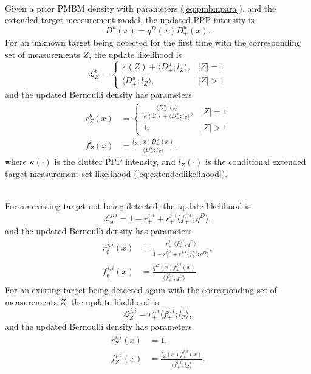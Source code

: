 ~\\
Given a prior PMBM density with parameters (\ref{eq:pmbmpara}), and the extended target measurement model, the updated PPP intensity is
\begin{equation}
    D^u(x) = q^D(x)D^u_+(x).
\end{equation}
For an unknown target being detected for the first time with the corresponding set of measurements $Z$, the update likelihood is
\begin{equation}
    \mathcal{L}^{b}_Z = \begin{cases}
    \kappa(Z) + \langle D^u_+;l_Z\rangle, & |Z| = 1\\
    \langle D^u_+;l_Z\rangle, & |Z| > 1
    \end{cases}
    \label{eq:new}
\end{equation}
and the updated Bernoulli density has parameters
\begin{subequations}
\begin{align}
    r^{b}_Z(x) &= \begin{cases}
    \frac{\langle D^u_+;l_Z\rangle}{\kappa(Z) + \langle D^u_+;l_Z\rangle}, & |Z| = 1\\
    1, & |Z|>1
    \end{cases}\\
    f^{b}_Z(x) &= \frac{l_Z(x)D^u_+(x)}{\langle D^u_+;l_Z\rangle}.
\end{align}
\end{subequations}
where $\kappa(\cdot)$ is the clutter PPP intensity, and $l_Z(\cdot)$ is the conditional extended target measurement set likelihood (\ref{eq:extendedlikelihood}).

~\\
For an existing target not being detected, the update likelihood is 
\begin{equation}
    \mathcal{L}_{\emptyset}^{j,i} = 1 - r^{j,i}_+ + r^{j,i}_+\langle f^{j,i}_+;q^D\rangle,
    \label{eq:miss}
\end{equation}
and the updated Bernoulli density has parameters
\begin{subequations}
\begin{align}
    r_{\emptyset}^{j,i}(x) &= \frac{r^{j,i}_+\langle f^{j,i}_+;q^D\rangle}{1 - r^{j,i}_+ + r^{j,i}_+\langle f^{j,i}_+;q^D\rangle},\\
    f_{\emptyset}^{j,i}(x) &= \frac{q^D(x)f^{j,i}_+(x)}{\langle f^{j,i}_+;q^D\rangle}.
\end{align}
\end{subequations}
For an existing target being detected again with the corresponding set of measurements $Z$, the update likelihood is
\begin{equation}
    \mathcal{L}^{j,i}_Z = r^{j,i}_+\langle f^{j,i}_+;l_Z\rangle,
    \label{eq:upd}
\end{equation}
and the updated Bernoulli density has parameters
\begin{subequations}
\begin{align}
r^{j,i}_Z(x)&= 1,\\
f^{j,i}_Z(x) &= \frac{l_Z(x)f^{j,i}_+(x)}{\langle f^{j,i}_+;l_Z\rangle}.
\end{align}
\end{subequations}



